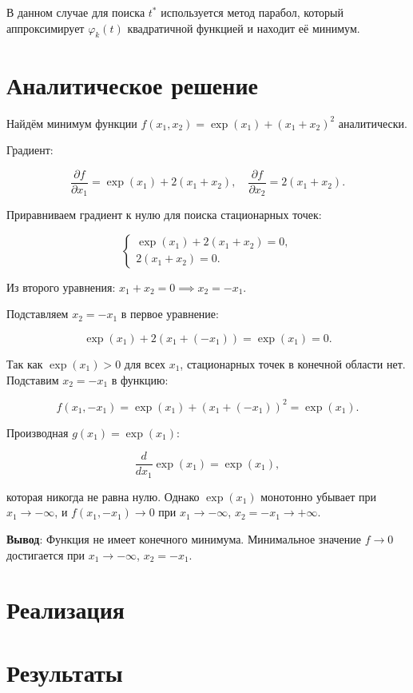 \documentclass[a4paper, 14pt]{extarticle}
\begin{document}
В данном случае для поиска \( t^* \) используется метод парабол, который аппроксимирует \( \varphi_k(t) \) квадратичной функцией и 
находит её минимум.

\section{Аналитическое решение}

Найдём минимум функции \( f(x_1, x_2) = \exp(x_1) + (x_1 + x_2)^2 \) аналитически.

Градиент:

\[
\frac{\partial f}{\partial x_1} = \exp(x_1) + 2(x_1 + x_2), \quad \frac{\partial f}{\partial x_2} = 2(x_1 + x_2).
\]

Приравниваем градиент к нулю для поиска стационарных точек:

\[
\begin{cases}
\exp(x_1) + 2(x_1 + x_2) = 0, \\
2(x_1 + x_2) = 0.
\end{cases}
\]

Из второго уравнения: \( x_1 + x_2 = 0 \implies x_2 = -x_1 \).

Подставляем \( x_2 = -x_1 \) в первое уравнение:

\[
\exp(x_1) + 2(x_1 + (-x_1)) = \exp(x_1) = 0.
\]

Так как \( \exp(x_1) > 0 \) для всех \( x_1 \), стационарных точек в конечной области нет. Подставим \( x_2 = -x_1 \) в функцию:

\[
f(x_1, -x_1) = \exp(x_1) + (x_1 + (-x_1))^2 = \exp(x_1).
\]

Производная \( g(x_1) = \exp(x_1) \):

\[
\frac{d}{dx_1} \exp(x_1) = \exp(x_1),
\]

которая никогда не равна нулю. Однако \( \exp(x_1) \) монотонно убывает при \( x_1 \to -\infty \), и \( f(x_1, -x_1) \to 0 \) при \( x_1 \to -\infty \), \( x_2 = -x_1 \to +\infty \).

\textbf{Вывод}: Функция не имеет конечного минимума. Минимальное значение \( f \to 0 \) достигается при \( x_1 \to -\infty \), \( x_2 = -x_1 \).

\section{Реализация}



\section{Результаты}
\end{document}
